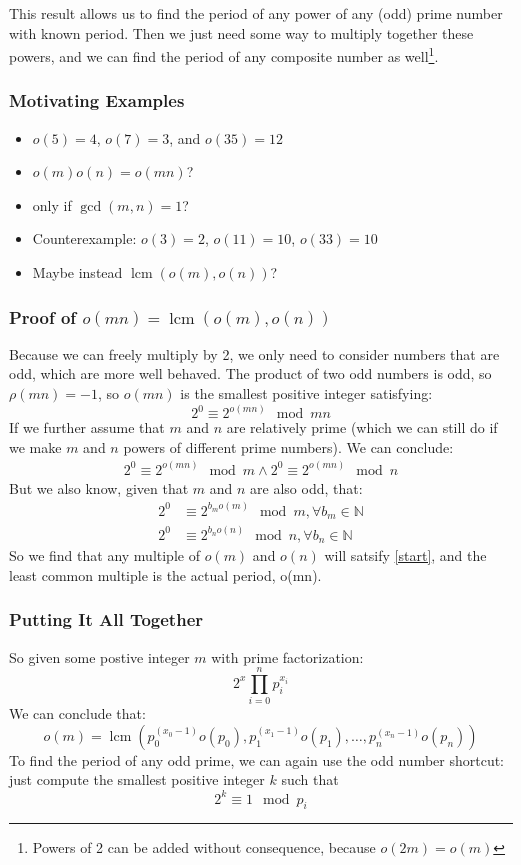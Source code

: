 \documentclass{article}
\DeclareMathOperator{\lcm}{lcm}
\begin{document}
  This result allows us to find the period of any power of any (odd) prime number with known period. Then we just need some way to multiply together these powers, and we can find the period of any composite number as well\footnote{Powers of 2 can be added without consequence, because $o(2m) = o(m)$}.
  \subsubsection{Motivating Examples}
  \begin{itemize}
  \item $o(5) = 4$, $o(7) = 3$, and $o(35) = 12$
  \item $o(m)o(n) = o(mn)$?
  \item only if $\gcd(m, n) = 1$?
  \item Counterexample: $o(3) = 2$, $o(11) = 10$, $o(33) = 10$
  \item Maybe instead $\lcm(o(m), o(n))$? 
  \end{itemize}
  \subsubsection{Proof of $o(mn) = \lcm(o(m), o(n))$}
  Because we can freely multiply by 2, we only need to consider numbers that are odd, which are more well behaved. The product of two odd numbers is odd, so $\rho(mn) = -1$, so $o(mn)$ is the smallest positive integer satisfying:
  \begin{equation}\label{start}
    2^0 \equiv 2^{o(mn)} \mod mn
  \end{equation}
  If we further assume that $m$ and $n$ are relatively prime (which we can still do if we make $m$ and $n$ powers of different prime numbers). We can conclude:
  \begin{align}
    2^0 \equiv 2^{o(mn)} \mod m \land 2^0 \equiv 2^{o(mn)} \mod n
  \end{align}
  But we also know, given that $m$ and $n$ are also odd, that:
  \begin{align}
    2^0 &\equiv 2^{b_mo(m)} \mod m, \forall b_m \in \mathbb{N}\\
    2^0 &\equiv 2^{b_no(n)} \mod n, \forall b_n \in \mathbb{N}
  \end{align}
  So we find that any multiple of $o(m)$ and $o(n)$ will satsify \eqref{start}, and the least common multiple is the actual period, o(mn).
  \subsubsection{Putting It All Together}
  So given some postive integer $m$ with prime factorization:
  \begin{equation}
    2^x\prod^n_{i=0}p_i^{x_i}
  \end{equation}
  We can conclude that:
  \begin{equation}
    o(m) = \lcm(p_0^{(x_0-1)}o(p_0), p_1^{(x_1-1)}o(p_1), \dots, p_n^{(x_n-1)}o(p_n))
  \end{equation}
  To find the period of any odd prime, we can again use the odd number shortcut: just compute the smallest positive integer $k$ such that
  \begin{equation}
    2^k \equiv 1 \mod p_i
  \end{equation}
\end{document}
